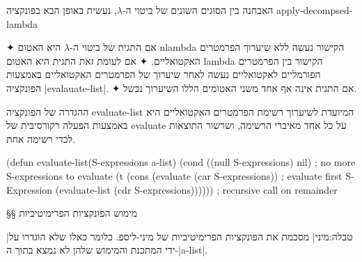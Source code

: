 האבחנה בין הסוגים השונים של ביטוי ה-$λ$, נעשית באופן הבא בפונקציה
apply-decompsed-lambda
\begin{itemize}
  ✦
  אם התגית של ביטוי ה-$λ$ היא האטום nlambda הקישור נעשה
  ללא שיערוך הפרמטרים
  האקטואליים.
  ✦ אם לעומת זאת התגית היא האטום lambda הקישור בין הפרמטרים הפורמליים
  לאקטואליים נעשה לאחר שיערוך של הפרמטרים האקטואליים באמצעות הפונקציה
  \E|evalauate-list|. ✦
  אם התגית אינה אף אחד משני האטומים הללו השיערוך נכשל.
\end{itemize}

ההגדרה של הפונקציה evaluate-list המיועדת לשיערוך רשימת הפרמטרים האקטואליים היא
באמצעות הפעלה רקורסיבית של evaluate על כל אחד מאיברי הרשימה, ושרשור התוצאות
לכדי רשימה אחת.
\begin{KERNEL}
(defun evaluate-list(S-expressions a-list)
  (cond ((null S-expressions) nil) ; no more S-expressions to evaluate
    (t (cons
          (evaluate (car S-expressions)) ; evaluate first S-Expression
          (evaluate-list (cdr S-expressions)))))) ; recursive call on remainder
\end{KERNEL}

\vfill
\pagebreak[4]
§§ מימוש הפונקציות הפרימיטיביות

|טבלה:מיני| מסכמת את הפונקציות הפרימיטיביות של מיני-ליספ. כלומר כאלו שלא
הוגדרו על ידי המתכנת והמימוש שלהן לא נמצא בתוך ה-\E|a-list|.



